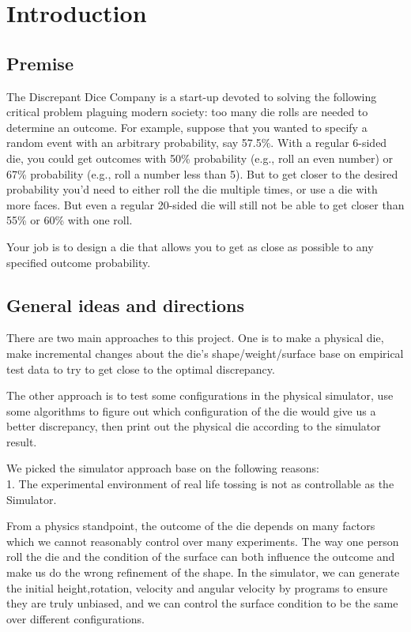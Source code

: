 \section{Introduction}
\subsection{Premise}
The Discrepant Dice Company is a start-up devoted to solving the following critical problem plaguing modern society: too many die rolls are needed to determine an outcome. For example, suppose that you wanted to specify a random event with an arbitrary probability, say 57.5\%. With a regular 6-sided die, you could get outcomes with 50\% probability (e.g., roll an even number) or 67\% probability (e.g., roll a number less than 5). But to get closer to the desired probability you'd need to either roll the die multiple times, or use a die with more faces. But even a regular 20-sided die will still not be able to get closer than 55\% or 60\% with one roll.

Your job is to design a die that allows you to get as close as possible to any specified outcome probability.

\subsection{General ideas and directions}
There are two main approaches to this project. One is to make a physical die, make incremental changes about the die's shape/weight/surface base on empirical test data to try to get close to the optimal discrepancy.

The other approach is to test some configurations in the physical simulator, use some algorithms to figure out which configuration of the die would give us a better discrepancy, then print out the physical die according to the simulator result. 

We picked the simulator approach base on the following reasons:\\

1. The experimental environment of real life tossing is not as controllable as the Simulator.

From a physics standpoint, the outcome of the die depends on many factors which we cannot reasonably control over many experiments. The way one person roll the die and the condition of the surface can both influence the outcome and make us do the wrong refinement of the shape. In the simulator, we can generate the initial height,rotation, velocity and angular velocity by programs to ensure they are truly unbiased, and we can control the surface condition to be the same over different configurations.\\

